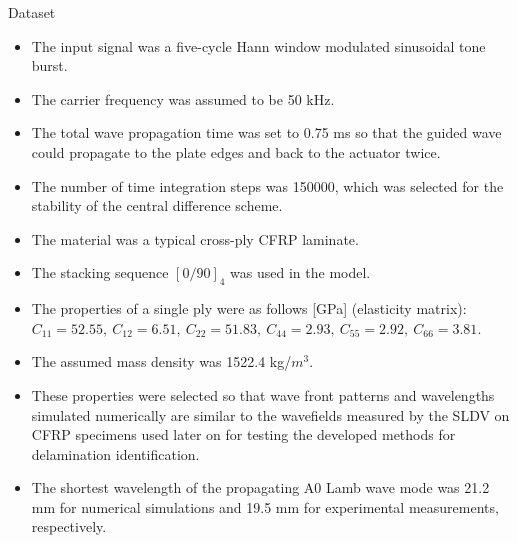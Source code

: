 \documentclass[10pt,aspectratio=169,dvipsnames]{beamer} %
\begin{document}
	\begin{frame}{Dataset}
		\justifying\footnotesize	
		\begin{itemize}
			\item The input signal was a five-cycle Hann window modulated sinusoidal tone burst. 
			\item The carrier frequency was assumed to be 50 kHz. 
			\item The total wave propagation time was set to 0.75 ms so that the guided wave could propagate to the plate edges and back to the actuator twice. 
			\item The number of time integration steps was 150000, which was selected for the stability of the central difference scheme.
			\item The material was a typical cross-ply CFRP laminate. 
			\item The stacking sequence \([0/90]_4\) was used in the model. 
			\item The properties of a single ply were as follows [GPa] (elasticity matrix): \(C_{11}=52.55,\ C_{12}=6.51,\ C_{22}=51.83,\ C_{44}=2.93,\ C_{55}=2.92,\ C_{66}=3.81\). 
			\item The assumed mass density was 1522.4 kg/\(m^3\). 
			\item These properties were selected so that wave front patterns and wavelengths simulated numerically are similar to the wavefields measured by the SLDV on CFRP specimens used later on for testing the developed methods for delamination identification. 
			\item The shortest wavelength of the propagating A0 Lamb wave mode was 21.2 mm for numerical simulations and 19.5 mm for experimental measurements, respectively.
		\end{itemize}		
	\end{frame}
\end{document}
